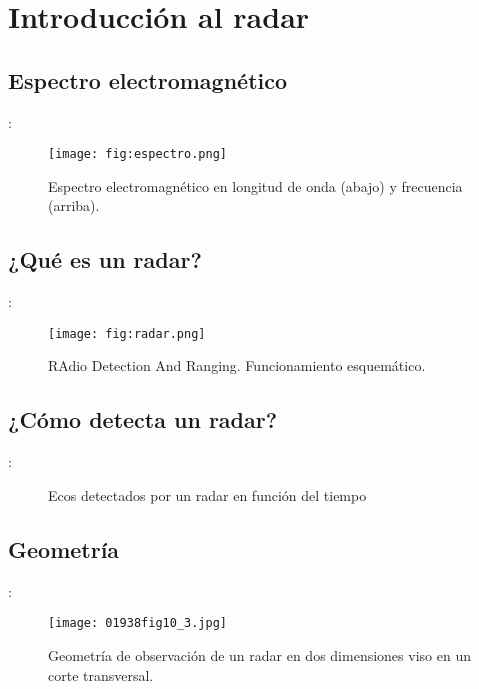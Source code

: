 \section{Introducción al radar}
\subsection{Espectro electromagnético}
\begin{frame}{\secname : \subsecname}
  \begin{figure}
    \centering
    \texttt{[image: fig:espectro.png]}
    \caption{Espectro electromagnético en longitud de onda (abajo) y frecuencia (arriba).}
    \label{}
  \end{figure}
\end{frame}

\subsection{¿Qué es un radar?}
\begin{frame}{\secname : \subsecname}
    \begin{figure}
      \centering
      \texttt{[image: fig:radar.png]}
      \caption{RAdio Detection And Ranging. Funcionamiento esquemático.}
      \label{}
    \end{figure}
\end{frame}

\subsection{¿Cómo detecta un radar?}
\begin{frame}{\secname : \subsecname}
  \begin{figure}
    \centering
    \caption{Ecos detectados por un radar en función del tiempo}
    \label{}
  \end{figure}
\end{frame}

\subsection{Geometría}
\begin{frame}{\secname : \subsecname}
  \begin{figure}
    \centering
    \texttt{[image: 01938fig10\_3.jpg]}
    \caption{Geometría de observación de un radar en dos dimensiones viso en un corte transversal.}
    \label{}
  \end{figure}
\end{frame}

